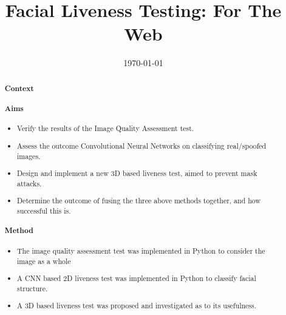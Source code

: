 \documentclass[10pt,a4paper]{article}
\title{Facial Liveness Testing: For The Web}
\author{} %
\date{\today}
\begin{document}
\maketitle

\begin{abstract}

\paragraph{Context}

\paragraph{Aims}
    \begin{itemize}
        \item Verify the results of the Image Quality Assessment test.
        \item Assess the outcome Convolutional Neural Networks on classifying real/spoofed images.
        \item Design and implement a new 3D based liveness test, aimed to prevent mask attacks.
        \item Determine the outcome of fusing the three above methods together, and how successful this is.
    \end{itemize}

\paragraph{Method}
   \begin{itemize}
        \item The image quality assessment test was implemented in Python to consider the image as a whole
        \item A CNN based 2D liveness test was implemented in Python to classify facial structure.
        \item A 3D based liveness test was proposed and investigated as to its usefulness.
   \end{itemize}

\end{abstract}
\end{document}
